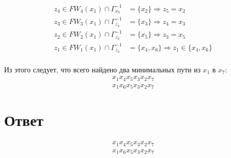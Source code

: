 \documentclass{article}
\begin{document}
$$
\begin{aligned}
    z_4 \in FW_4(x_1) \cap \Gamma^{-1}_{x_7} &= \{x_2\} \Rightarrow z_5 = x_2 \\
    z_3 \in FW_3(x_1) \cap \Gamma^{-1}_{z_4} &= \{x_3\} \Rightarrow z_4 = x_3 \\
    z_2 \in FW_2(x_1) \cap \Gamma^{-1}_{z_3} &= \{x_5\} \Rightarrow z_3 = x_5 \\
    z_1 \in FW_1(x_1) \cap \Gamma^{-1}_{z_2} &= \{x_4, x_6\} \Rightarrow
    z_1 \in \{x_4, x_6\} \\
\end{aligned}
$$

Из этого следует, что всего найдено два минимальных пути из $x_1$ в $x_7$:
$$
\begin{aligned}
    x_1x_4x_5x_3x_2x_7 \\
    x_1x_6x_5x_3x_2x_7
\end{aligned}
$$

\section*{Ответ}
$$
\begin{aligned}
    x_1x_4x_5x_3x_2x_7 \\
    x_1x_6x_5x_3x_2x_7
\end{aligned}
$$
\end{document}
